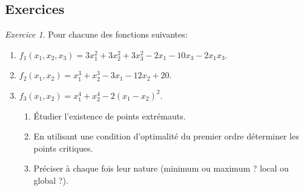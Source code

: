 \documentclass[a4paper,12pt,openany]{book}
\theoremstyle{plain}
\theoremstyle{definition}
\theoremstyle{remark}
\newtheorem{exercise}{Exercice}[section]
\theoremstyle{nbstyle}
\begin{document}
	\subsection{Exercices }
	\begin{exercise}\label{Exo1chap1}
		Pour chacune des fonctions suivantes:\\
		\begin{enumerate}
			\item $f_{1}\left(x_{1}, x_{2}, x_{3}\right)=3 x_{1}^{2}+3 x_{2}^{2}+3 x_{3}^{2}-2 x_{1}-10 x_{3}-2 x_{1} x_{3}$.\\
			\item $f_{2}\left(x_{1}, x_{2}\right)=x_{1}^{3}+x_{2}^{3}-3 x_{1}-12 x_{2}+20$.\\
			\item $f_{3}\left(x_{1}, x_{2}\right)=x_{1}^{4}+x_{2}^{4}-2\left(x_{1}-x_{2}\right)^{2}$.\\
			\begin{enumerate}
				\item Étudier l'existence de points extrémauts.\\
				\item En utilisant une condition d'optimalité du premier ordre déterminer les points critiques.\\
				\item Préciser à chaque fois leur nature (minimum ou maximum ? local ou global ?).
			\end{enumerate}
		\end{enumerate}
	\end{exercise}
	
\end{document}
